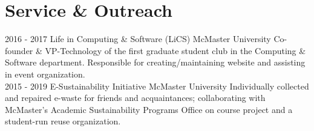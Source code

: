 \documentclass[letterpaper]{twentysecondcv} %
\begin{document}
\section{Service \& Outreach}
\begin{twenty}
	\twentyitem
	{2016 -}
	{2017}
	{Life in Computing \& Software (LiCS)}
	{McMaster University}
	{}
	{Co-founder \& VP-Technology of the first graduate student club in the Computing \& Software department. Responsible for creating/maintaining website and assisting in event organization.}
\\
\twentyitem
{2015 -}
{2019}
{E-Sustainability Initiative}
{McMaster University}
{}
{Individually collected and repaired e-waste for friends and acquaintances; collaborating with McMaster's Academic Sustainability Programs Office on course project and a student-run reuse organization.}
\end{twenty}

\end{document}

